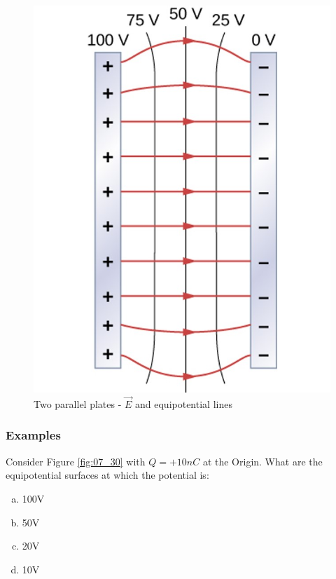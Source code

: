 \documentclass[14pt]{memoir}
\begin{document}
\begin{figure}[H]
\begin{center}
\includegraphics[scale=0.50]{fig/fig_07_35.jpg}
\caption{Two parallel plates - $\vec{E}$ and equipotential lines}
\label{fig:07_35}
\end{center}
\end{figure}

\subsubsection{Examples}

Consider Figure \ref{fig:07_30} with $Q = +10nC$ at the Origin. What are the equipotential surfaces at which the potential is:

\begin{enumerate}[(a)]
\item 100V
\item 50V
\item 20V
\item 10V
\end{enumerate}
\end{document}
